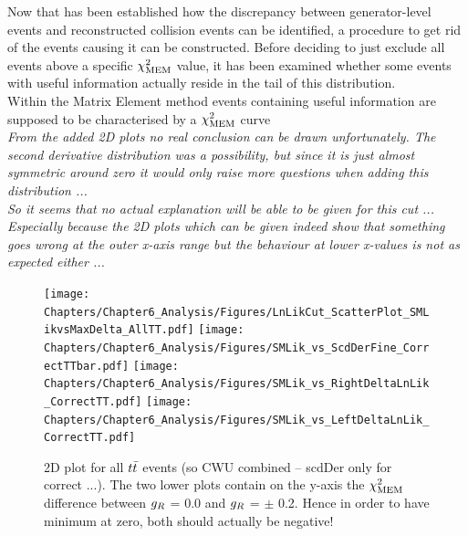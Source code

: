 Now that has been established how the discrepancy between generator-level events and reconstructed collision events can be identified, a procedure to get rid of the events causing it can be constructed.
Before deciding to just exclude all events above a specific $\chi^{2}_{\textrm{MEM}}$ value, it has been examined whether some events with useful information actually reside in the tail of this distribution.
\\
Within the Matrix Element method events containing useful information are supposed to be characterised by a $\chi^{2}_{\textrm{MEM}}$ curve \\
\textit{From the added 2D plots no real conclusion can be drawn unfortunately. The second derivative distribution was a possibility, but since it is just almost symmetric around zero it would only raise more questions when adding this distribution ...\\ So it seems that no actual explanation will be able to be given for this cut ...\\ Especially because the 2D plots which can be given indeed show that something goes wrong at the outer x-axis range but the behaviour at lower x-values is not as expected either ...}
\\
\begin{figure}[h!t]
 \centering
 \texttt{[image: Chapters/Chapter6\_Analysis/Figures/LnLikCut\_ScatterPlot\_SMLikvsMaxDelta\_AllTT.pdf]}
 \texttt{[image: Chapters/Chapter6\_Analysis/Figures/SMLik\_vs\_ScdDerFine\_CorrectTTbar.pdf]}
 \texttt{[image: Chapters/Chapter6\_Analysis/Figures/SMLik\_vs\_RightDeltaLnLik\_CorrectTT.pdf]}
 \texttt{[image: Chapters/Chapter6\_Analysis/Figures/SMLik\_vs\_LeftDeltaLnLik\_CorrectTT.pdf]}
 \caption{2D plot for all $t\bar{t}$ events (so CWU combined -- scdDer only for correct ...). The two lower plots contain on the y-axis the $\chi^{2}_{\textrm{MEM}}$ difference between $g_{R}$ = 0.0 and $g_{R}$ = $\pm$ 0.2. Hence in order to have minimum at zero, both should actually be negative!} \label{fig::SMLik2D}
\end{figure}

